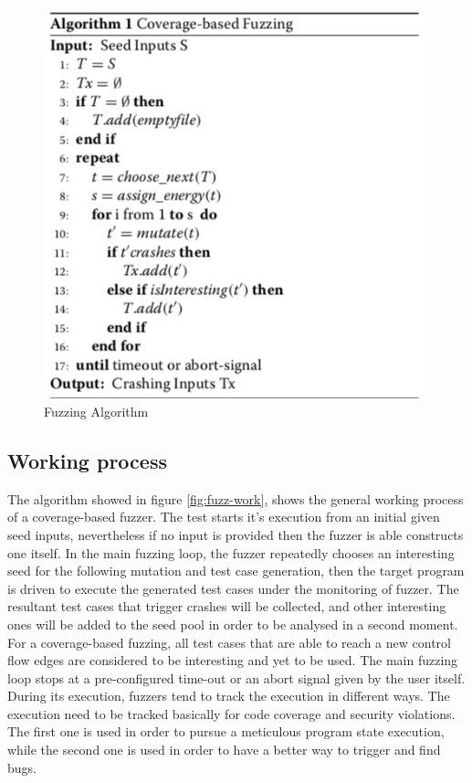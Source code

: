 \begin{figure}[tbh]
  \centering
  \includegraphics[width=0.7\linewidth]{images/intro/Algo-fuzz.png}
  \caption[Fuzzing Algorithm]{Fuzzing Algorithm}
  \label{fig:Algo-fuzz}
\end{figure}

\subsection{Working process}

The algorithm showed in figure \ref{fig:fuzz-work}, shows the general working process of a coverage-based fuzzer. The test starts it's execution from an initial given seed inputs, 
nevertheless if no input is provided then the fuzzer is able constructs one itself. 
In the main fuzzing loop, the fuzzer repeatedly chooses an interesting seed for the following mutation and test case generation, then the target program is driven to execute the generated test cases under the monitoring of fuzzer.
The resultant test cases that trigger crashes will be collected, and other interesting ones will be added to the seed pool in order to be analysed in a second moment. 
For a coverage-based fuzzing, all test cases that are able to reach a new control flow edges are considered to be interesting and yet to be used.
 The main fuzzing loop stops at a pre-configured time-out or an abort signal given by the user itself.
During its execution, fuzzers tend to track the execution in different ways. The execution need to be tracked basically for code coverage and security violations.
 The first one is used in order to pursue a meticulous program state execution, while the
second one is used in order to have a better way to trigger and find bugs.

